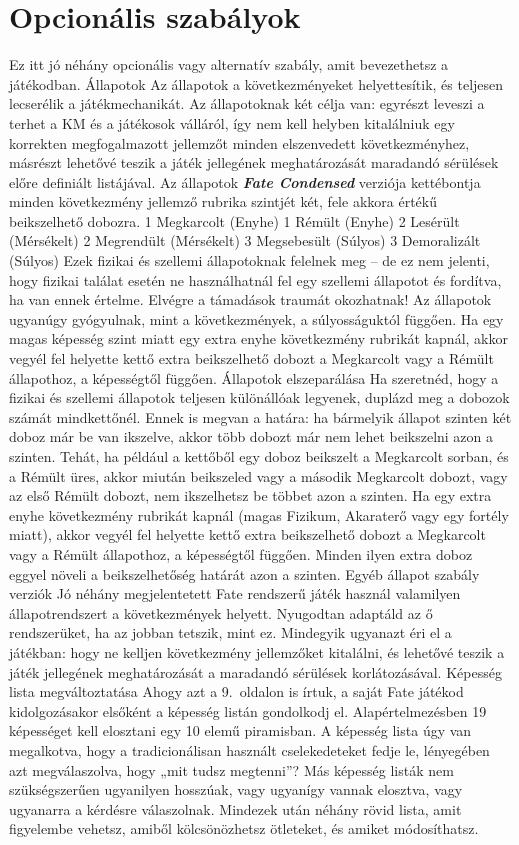 \documentclass[oneside]{book}
\newcommand{\fate}[1]{\textbf{\textit{#1}}}
\newcommand{\onpage}[1]{#1.~oldalon}
\begin{document}
\chapter{Opcionális szabályok}
Ez itt jó néhány opcionális vagy alternatív szabály, amit bevezethetsz a játékodban.
Állapotok
Az állapotok a következményeket helyettesítik, és teljesen lecserélik a játékmechanikát. Az állapotoknak két célja van: egyrészt leveszi a terhet a KM és a játékosok válláról, így nem kell helyben kitalálniuk egy korrekten megfogalmazott jellemzőt minden elszenvedett következményhez, másrészt lehetővé teszik a játék jellegének meghatározását maradandó sérülések előre definiált listájával.
Az állapotok \fate{Fate Condensed} verziója kettébontja minden következmény jellemző rubrika szintjét két, fele akkora értékű beikszelhető dobozra.
1 Megkarcolt (Enyhe)
1 Rémült (Enyhe)
2 Lesérült (Mérsékelt)
2 Megrendült (Mérsékelt)
3 Megsebesült (Súlyos)
3 Demoralizált (Súlyos)
Ezek fizikai és szellemi állapotoknak felelnek meg – de ez nem jelenti, hogy fizikai találat esetén ne használhatnál fel egy szellemi állapotot és fordítva, ha van ennek értelme. Elvégre a támadások traumát okozhatnak!
Az állapotok ugyanúgy gyógyulnak, mint a következmények, a súlyosságuktól függően.
Ha egy magas képesség szint miatt egy extra enyhe következmény rubrikát kapnál, akkor vegyél fel helyette kettő extra beikszelhető dobozt a Megkarcolt vagy a Rémült állapothoz, a képességtől függően.
Állapotok elszeparálása
Ha szeretnéd, hogy a fizikai és szellemi állapotok teljesen különállóak legyenek, duplázd meg a dobozok számát mindkettőnél. Ennek is megvan a határa: ha bármelyik állapot szinten két doboz már be van ikszelve, akkor több dobozt már nem lehet beikszelni azon a szinten. Tehát, ha például a kettőből egy doboz beikszelt a Megkarcolt sorban, és a Rémült üres, akkor miután beikszeled vagy a második Megkarcolt dobozt, vagy az első Rémült dobozt, nem ikszelhetsz be többet azon a szinten.
Ha egy extra enyhe következmény rubrikát kapnál (magas Fizikum, Akaraterő vagy egy fortély miatt), akkor vegyél fel helyette kettő extra beikszelhető dobozt a Megkarcolt vagy a Rémült állapothoz, a képességtől függően. Minden ilyen extra doboz eggyel növeli a beikszelhetőség határát azon a szinten.
Egyéb állapot szabály verziók
Jó néhány megjelentetett Fate rendszerű játék használ valamilyen állapotrendszert a következmények helyett. Nyugodtan adaptáld az ő rendszerüket, ha az jobban tetszik, mint ez. Mindegyik ugyanazt éri el a játékban: hogy ne kelljen következmény jellemzőket kitalálni, és lehetővé teszik a játék jellegének meghatározását a maradandó sérülések korlátozásával.
Képesség lista megváltoztatása
Ahogy azt a \onpage{9} is írtuk, a saját Fate játékod kidolgozásakor elsőként a képesség listán gondolkodj el. Alapértelmezésben 19 képességet kell elosztani egy 10 elemű piramisban. A képesség lista úgy van megalkotva, hogy a tradicionálisan használt cselekedeteket fedje le, lényegében azt megválaszolva, hogy „mit tudsz megtenni”? Más képesség listák nem szükségszerűen ugyanilyen hosszúak, vagy ugyanígy vannak elosztva, vagy ugyanarra a kérdésre válaszolnak. Mindezek után néhány rövid lista, amit figyelembe vehetsz, amiből kölcsönözhetsz ötleteket, és amiket módosíthatsz.
\end{document}
